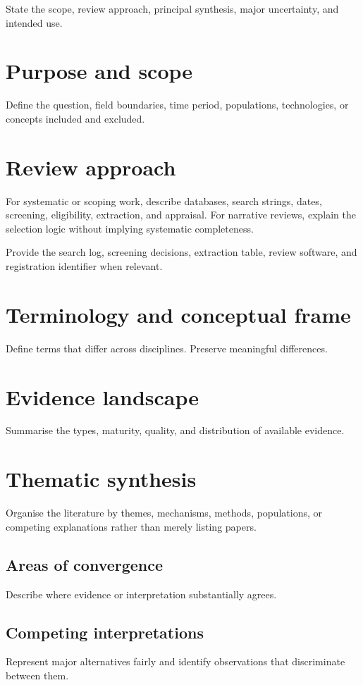 \documentclass[11pt,a4paper]{article}
\begin{document}
\MakeGenesisTitle
\begin{GenesisAbstract}
State the scope, review approach, principal synthesis, major uncertainty, and intended use.
\end{GenesisAbstract}
\section{Purpose and scope}
Define the question, field boundaries, time period, populations, technologies, or concepts
included and excluded.
\section{Review approach}
For systematic or scoping work, describe databases, search strings, dates, screening,
eligibility, extraction, and appraisal. For narrative reviews, explain the selection logic
without implying systematic completeness.
\begin{GenesisProvenance}
Provide the search log, screening decisions, extraction table, review software, and
registration identifier when relevant.
\end{GenesisProvenance}
\section{Terminology and conceptual frame}
Define terms that differ across disciplines. Preserve meaningful differences.
\section{Evidence landscape}
Summarise the types, maturity, quality, and distribution of available evidence.
\section{Thematic synthesis}
Organise the literature by themes, mechanisms, methods, populations, or competing
explanations rather than merely listing papers.
\subsection{Areas of convergence}
Describe where evidence or interpretation substantially agrees.
\subsection{Competing interpretations}
Represent major alternatives fairly and identify observations that discriminate between them.
\end{document}
